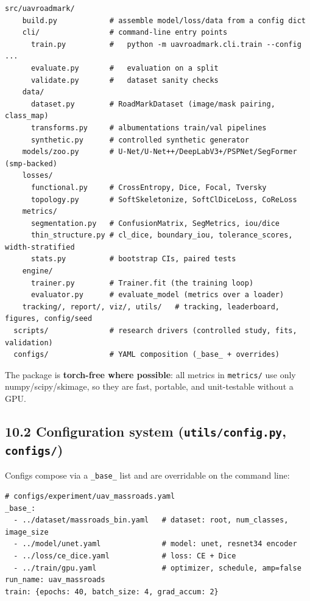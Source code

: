 \documentclass[11pt]{article}
\begin{document}
\begin{Verbatim}[breaklines=true,breakanywhere=true,fontsize=\footnotesize]
  src/uavroadmark/
    build.py            # assemble model/loss/data from a config dict
    cli/                # command-line entry points
      train.py          #   python -m uavroadmark.cli.train --config ...
      evaluate.py       #   evaluation on a split
      validate.py       #   dataset sanity checks
    data/
      dataset.py        # RoadMarkDataset (image/mask pairing, class_map)
      transforms.py     # albumentations train/val pipelines
      synthetic.py      # controlled synthetic generator
    models/zoo.py       # U-Net/U-Net++/DeepLabV3+/PSPNet/SegFormer (smp-backed)
    losses/
      functional.py     # CrossEntropy, Dice, Focal, Tversky
      topology.py       # SoftSkeletonize, SoftClDiceLoss, CoReLoss
    metrics/
      segmentation.py   # ConfusionMatrix, SegMetrics, iou/dice
      thin_structure.py # cl_dice, boundary_iou, tolerance_scores, width-stratified
      stats.py          # bootstrap CIs, paired tests
    engine/
      trainer.py        # Trainer.fit (the training loop)
      evaluator.py      # evaluate_model (metrics over a loader)
    tracking/, report/, viz/, utils/   # tracking, leaderboard, figures, config/seed
  scripts/              # research drivers (controlled study, fits, validation)
  configs/              # YAML composition (_base_ + overrides)
\end{Verbatim}

The package is \textbf{torch-free where possible}: all metrics in \texttt{metrics/} use only numpy/scipy/skimage, so they are fast, portable, and unit-testable without a GPU.

\subsection*{10.2 Configuration system (\texttt{utils/config.py}, \texttt{configs/})}

Configs compose via a \texttt{\_base\_} list and are overridable on the command line:

\begin{Verbatim}[breaklines=true,breakanywhere=true,fontsize=\footnotesize]
# configs/experiment/uav_massroads.yaml
_base_:
  - ../dataset/massroads_bin.yaml   # dataset: root, num_classes, image_size
  - ../model/unet.yaml              # model: unet, resnet34 encoder
  - ../loss/ce_dice.yaml            # loss: CE + Dice
  - ../train/gpu.yaml               # optimizer, schedule, amp=false
run_name: uav_massroads
train: {epochs: 40, batch_size: 4, grad_accum: 2}
\end{Verbatim}
\end{document}
